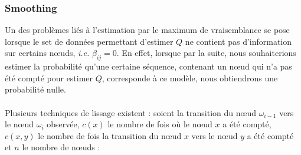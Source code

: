 \documentclass[a4paper,titlepage]{report}
\begin{document}
\subsubsection{Smoothing}
Un des problèmes liés à l'estimation par le maximum de vraisemblance se pose lorsque le set de données permettant d'estimer $Q$ ne contient pas d'information sur certains nœuds, \textit{i.e.} $\beta_{ij} = 0$. En effet, lorsque par la suite, nous souhaiterions estimer la probabilité qu'une certaine séquence, contenant un nœud qui n'a pas été compté pour estimer $Q$, corresponde à ce modèle, nous obtiendrons une probabilité nulle.
\paragraph{}
Plusieurs techniques de lissage existent : soient la transition du nœud $\omega_{i-1}$ vers le nœud $\omega_i$ observée, $c(x)$ le nombre de fois où le nœud $x$ a été compté, $c(x,y)$ le nombre de fois la transition du nœud $x$ vers le nœud $y$ a été compté et $n$ le nombre de nœuds : \\
\end{document}
